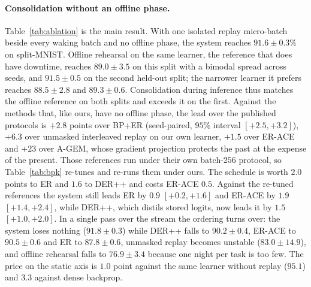 \documentclass{article}
\begin{document}
\paragraph{Consolidation without an offline phase.} Table~\ref{tab:ablation} is the
main result. With one isolated replay micro-batch beside every waking batch and no offline
phase, the system reaches $91.6\pm0.3\%$ on split-MNIST. Offline rehearsal on the same
learner, the reference that does have downtime, reaches $89.0\pm3.5$ on this split with a
bimodal spread across seeds, and $91.5\pm0.5$ on the second held-out split; the narrower
learner it prefers reaches $88.5\pm2.8$ and $89.3\pm0.6$. Consolidation during inference thus
matches the offline reference on both splits and exceeds it on the first. Against the methods
that, like ours, have no offline phase, the lead over the published protocols is $+2.8$
points over BP+ER (seed-paired, $95\%$ interval $[+2.5,+3.2]$), $+6.3$ over unmasked
interleaved replay on our own learner, $+1.5$ over ER-ACE and $+23$ over A-GEM, whose
gradient projection protects the past at the expense of the present. Those references run
under their own batch-$256$ protocol, so Table~\ref{tab:bpk} re-tunes and re-runs them under
ours. The schedule is worth $2.0$ points to ER and $1.6$ to DER++ and costs ER-ACE $0.5$.
Against the re-tuned references the system still leads ER by $0.9$ $[+0.2,+1.6]$ and ER-ACE
by $1.9$ $[+1.4,+2.4]$, while DER++, which distils stored logits, now leads it by $1.5$
$[+1.0,+2.0]$. In a single pass over the stream the ordering turns over: the system loses
nothing ($91.8\pm0.3$) while DER++ falls to $90.2\pm0.4$, ER-ACE to $90.5\pm0.6$ and ER to
$87.8\pm0.6$, unmasked replay becomes unstable ($83.0\pm14.9$), and offline rehearsal falls
to $76.9\pm3.4$ because one night per task is too few. The price on the static axis is $1.0$
point against the same learner without replay ($95.1$) and $3.3$ against dense backprop.
\end{document}
